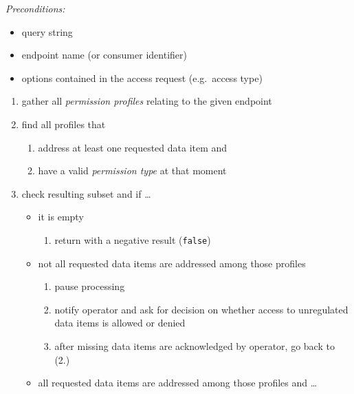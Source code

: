 \documentclass[12pt,english,a4paper,titlepage,cleardoublepage=empty,dottedtoc]{report}
\providecommand{\tightlist}{%
  \setlength{\itemsep}{0pt}\setlength{\parskip}{0pt}}
\begin{document}
\emph{Preconditions:}

\begin{itemize}
\tightlist
\item
  query string
\item
  endpoint name (or consumer identifier)
\item
  options contained in the access request (e.g.~access type)
\end{itemize}

\begin{enumerate}
\def\labelenumi{\arabic{enumi}.}
\item
  gather all \emph{permission profiles} relating to the given endpoint
\item
  find all profiles that

  \begin{enumerate}
  \def\labelenumii{\alph{enumii})}
  \tightlist
  \item
    address at least one requested data item and
  \item
    have a valid \emph{permission type} at that moment
  \end{enumerate}
\item
  check resulting subset and if \ldots{}

  \begin{itemize}
  \tightlist
  \item
    it is empty

    \begin{enumerate}
    \def\labelenumii{\arabic{enumii})}
    \tightlist
    \item
      return with a negative result (\texttt{false})
    \end{enumerate}
  \item
    not all requested data items are addressed among those profiles

    \begin{enumerate}
    \def\labelenumii{\arabic{enumii})}
    \tightlist
    \item
      pause processing
    \item
      notify operator and ask for decision on whether access to
      unregulated data items is allowed or denied
    \item
      after missing data items are acknowledged by operator, go back to
      (2.)
    \end{enumerate}
  \item
    all requested data items are addressed among those profiles and
    \ldots{}


\end{itemize}
\end{enumerate}
\end{document}
